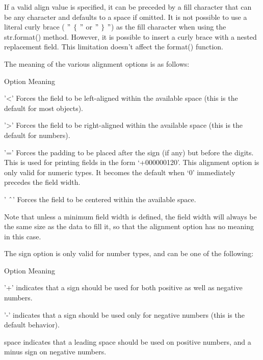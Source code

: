 If a valid align value is specified, it can be preceded by a fill character that can be any character and defaults to a space if omitted. It is not possible to use a literal curly brace ( $ " $ $  \{  $ $ " $ or  $ " $ $  \}  $ $ " $) as the fill character when using the str.format() method. However, it is possible to insert a curly brace with a nested replacement field. This limitation doesn’t affect the format() function. \par
The meaning of the various alignment options is as follows: \par
Option \hspace*{0.5in} Meaning \par
'<' \hspace*{0.5in} Forces the field to be left-aligned within the available space (this is the default for most objects). \par
'>' \hspace*{0.5in} Forces the field to be right-aligned within the available space (this is the default for numbers). \par
'=' \hspace*{0.5in} Forces the padding to be placed after the sign (if any) but before the digits. This is used for printing fields in the form ‘+000000120’. This alignment option is only valid for numeric types. It becomes the default when ‘0’ immediately precedes the field width. \par
' $  \string^  $' \hspace*{0.5in} Forces the field to be centered within the available space. \par
Note that unless a minimum field width is defined, the field width will always be the same size as the data to fill it, so that the alignment option has no meaning in this case. \par
The sign option is only valid for number types, and can be one of the following: \par
Option \hspace*{0.5in} Meaning \par
'+' \hspace*{0.5in} indicates that a sign should be used for both positive as well as negative numbers. \par
'-' \hspace*{0.5in} indicates that a sign should be used only for negative numbers (this is the default behavior). \par
space \hspace*{0.5in} indicates that a leading space should be used on positive numbers, and a minus sign on negative numbers. \par
